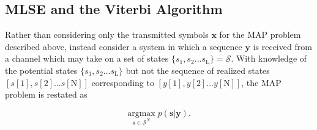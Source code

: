 \subsection{MLSE and the Viterbi Algorithm}
Rather than considering only the transmitted symbols $\mathbf{x}$  for the MAP problem described above, instead consider a system in which a sequence $\mathbf{y}$ is received from a channel which may take on a set of states $\{s_1, s_2... s_{\text{L}}\} = \mathcal{S}$. With knowledge of the potential states $\{s_1, s_2... s_{\text{L}}\}$ but not the sequence of realized states $[s[1], s[2]... s[\text{N}]]$ corresponding to $[y[1], y[2]... y[\text{N}]]$, the MAP problem is restated as

\begin{equation*}
\underset{\mathbf{s}\in\mathcal{S}^N}{\text{argmax}} \; p(\mathbf{s}|\mathbf{y}).
\end{equation*} 

